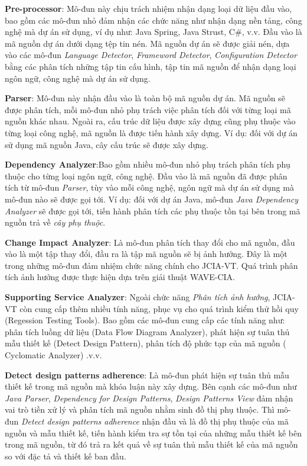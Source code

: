 \documentclass[12pt]{report}
\begin{document}
\noindent \textbf{Pre-processor}: Mô-đun này chịu trách nhiệm nhận dạng loại dữ liệu đầu vào, bao gồm các mô-đun nhỏ đảm nhận các chức năng như nhận dạng nền tảng, công nghệ mà dự án sử dụng, ví dụ như: Java Spring, Java Strust, C$\#$, v.v. Đầu vào là mã nguồn dự án dưới dạng tệp tin nén. Mã nguồn dự án sẽ được giải nén, dựa vào các mô-đun \textit{Language Detector}, \textit{Frameword Detector}, \textit{Configuration Detector} bằng các phân tích những tập tin cấu hình, tập tin mã nguồn để nhận dạng loại ngôn ngữ, công nghệ mà dự án sử dụng.

\noindent \textbf{Parser}: Mô-đun này nhận đầu vào là toàn bộ mã nguồn dự án. Mã nguồn sẽ được phân tích, mỗi mô-đun nhỏ phụ trách việc phân tích đối với từng loại mã nguồn khác nhau. Ngoài ra, cấu trúc dữ liệu được xây dựng cũng phụ thuộc vào từng loại công nghệ, mã nguồn là được tiến hành xây dựng. Ví dụ: đối với dự án sử dụng mã nguồn Java, cây cấu trúc sẽ được xây dựng.

\noindent \textbf{Dependency Analyzer}:Bao gồm nhiều mô-đun nhỏ phụ trách phân tích phụ thuộc cho từng loại ngôn ngữ, công nghệ. Đầu vào là mã nguồn đã được phân tích từ mô-đun \textit{Parser}, tùy vào mỗi công nghệ, ngôn ngữ mà dự án sử dụng mà mô-đun nào sẽ được gọi tới. Ví dụ: đối với dự án Java, mô-đun \textit{Java Dependency Analyzer} sẽ được gọi tới, tiến hành phân tích các phụ thuộc tồn tại bên trong mã nguồn trả về \textit{cây phụ thuộc}.

\noindent \textbf{Change Impact Analyzer}: Là mô-đun phân tích thay đổi cho mã nguồn, đầu vào là một tập thay đổi, đầu ra là tập mã nguồn sẽ bị ảnh hưởng. Đây là một trong những mô-đun đảm nhiệm chức năng chính cho JCIA-VT. Quá trình phân tích ảnh hưởng được thực hiện dựa trên giải thuật WAVE-CIA.

\noindent \textbf{Supporting Service Analyzer}: Ngoài chức năng \textit{Phân tích ảnh hưởng}, JCIA-VT còn cung cấp thêm nhiều tính năng, phục vụ cho quá trình kiểm thử hồi quy (Regession Testing Tools). Bao gồm các mô-đun cung cấp các tính năng như: phân tích luồng dữ liệu (Data Flow Diagram Analyzer), phát hiện sự tuân thủ mẫu thiết kế (Detect Design Pattern), phân tích độ phức tạp của mã nguồn ( Cyclomatic Analyzer) .v.v.

\noindent \textbf{Detect design patterns adherence}: Là mô-đun phát hiện sự tuân thủ mẫu thiết kế trong mã nguồn mà khóa luận này xây dựng. Bên cạnh các mô-đun như \textit{Java Parser}, \textit{Dependency for Design Patterns}, \textit{Design Patterns View} đảm nhận vai trò tiền xử lý và phân tích mã nguồn nhằm sinh đồ thị phụ thuộc. Thì mô-đun \textit{Detect design patterns adherence} nhận đầu và là đồ thị phụ thuộc của mã nguồn và mẫu thiết kế, tiến hành kiểm tra sự tồn tại của những mẫu thiết kế bên trong mã nguồn, từ đó trả ra kết quả về sự tuân thủ mẫu thiết kế của mã nguồn so với đặc tả và thiết kế ban đầu. 
\end{document}
